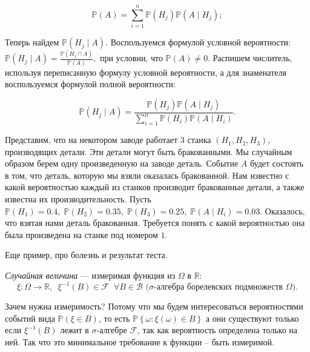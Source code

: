 \documentclass[12pt,a4paper]{article}
\begin{document}
\begin{definition}
    \[\mathbb{P}(A) = \sum\limits_{ i = 1}^{n} \mathbb{P} (H_j) \mathbb{P} (A \mid H_j);\]
\end{definition}

Теперь найдем \(\mathbb{P}(H_j \mid A)\). Воспользуемся формулой условной вероятности: \( \mathbb{P}(H_j \mid A) = \frac{ \mathbb{P} (H_j \cap A)}{ \mathbb{P}(A)},\) при условии, что \(\mathbb{P}(A) \neq 0\). Распишем числитель, используя переписанную формулу условной вероятности, а для знаменателя воспользуемся формулой полной вероятности: 

\begin{definition}
    \[\mathbb{P}(H_j \mid A) = \frac{\mathbb{P} (H_j) \mathbb{P} (A \mid H_j)}{ \sum\limits_{i = 1}^{n} \mathbb{P}(H_i) \mathbb{P}(A \mid H_i)}.\]
\end{definition}

\begin{example}
    Представим, что на некотором заводе работает \(3\) станка \((H_1, H_2, H_3)\), производящих детали. Эти детали могут быть бракованными. 
    Мы случайным образом берем одну произведенную на заводе деталь. Событие \(A\) будет состоять в том, что деталь, которую мы взяли оказалась бракованной. Нам известно с какой вероятностью каждый из станков производит бракованные детали, а также известна их производительность.
    Пусть \(\mathbb{P}(H_1) = 0.4, \; \mathbb{P}(H_2) = 0.35, \; \mathbb{P}(H_3) = 0.25, \; \mathbb{P}(A \mid H_i) = 0.03.\) Оказалось, что взятая нами деталь бракованная. Требуется понять с какой вероятностью она была произведена на станке под номером \(1\).

\end{example}

\begin{example}
    Еще пример, про болезнь и результат теста.
\end{example}

\begin{definition}
    \textit{Случайная величина} --- измеримая функция из \(\Omega\) в \(\mathbb{R}\): \[\xi : \Omega \to \mathbb{R}, \; \; \xi^{-1}(B) \in \mathcal{F} \;\; \forall B \in \mathcal{B} \text{ (} \sigma \text{-алгебра борелевских подмножеств } \Omega \text{)}.\]
\end{definition}

\begin{remark}
    Зачем нужна измеримость? Потому что мы будем интересоваться вероятностями событий вида \(\mathbb{P}(\xi \in B)\), то есть \(\mathbb{P}\left\{ \omega : \xi(\omega) \in B\right\}\) а они существуют только если \(\xi^{-1}(B)\) лежит в \(\sigma\)-алгебре \(\mathcal{F}\), так как вероятность определена только на ней. Так что это минимальное требование к функции -- быть измеримой.
\end{remark}
\end{document}
